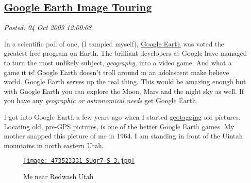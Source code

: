 %

\subsection*{\href{http://bakerjd99.wordpress.com/2009/10/04/google-earth-image-touring/}{Google Earth Image Touring}}


\noindent\emph{Posted: 04 Oct 2009 12:00:08}
\vspace{6pt}

In a scientific poll of one, (I sampled myself),
\href{http://earth.google.com/}{Google Earth} was voted the greatest
free program on Earth. The brilliant developers at Google have managed
to turn the most unlikely subject, \emph{geography,} into a video game.
And what a game it is! Google Earth doesn't troll around in an
adolescent make believe world. Google Earth serves up the real thing.
This would be amazing enough but with Google Earth you can explore the
Moon, Mars and the night sky as well. If you have any \emph{geographic
or astronomical needs} get Google Earth.

I got into Google Earth a few years ago when I started
\href{http://en.wikipedia.org/wiki/Geotagging}{geotagging} old pictures.
Locating old, pre-GPS pictures, is one of the better Google Earth games.
My mother snapped this picture of me in 1964. I am standing in front of
the Uintah mountains in north eastern Utah.


\captionsetup[figure]{labelformat=empty}
\begin{figure}[htbp]
\centering
\href{http://conceptcontrol.smugmug.com/People/The-Way-We-Were/7056082\_f3XX5\#473523331\_SUqr7}{\texttt{[image: 473523331\_SUqr7-S-3.jpg]}}
\caption{Me near  Redwash  Utah}
\label{fig:119X0}
\end{figure}




